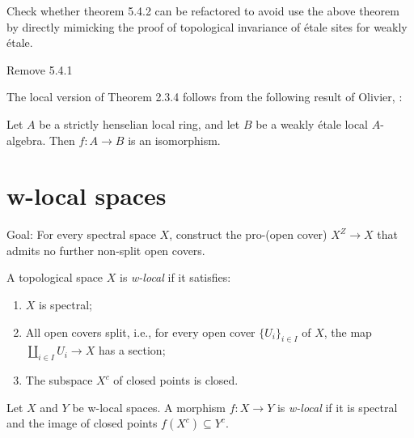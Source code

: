 \begin{lemma}
Check whether theorem 5.4.2 can be refactored to avoid use the above theorem by directly mimicking the proof of topological invariance of étale sites for weakly étale.

Remove 5.4.1



The local version of Theorem 2.3.4 follows from the following result of Olivier, \cite{Oli72}:

\begin{theorem}
Let $A$ be a strictly henselian local ring, and let $B$ be a weakly étale local $A$-algebra. Then $f: A \to B$ is an isomorphism.
    \label{thm:weakly-etale-local}
\end{theorem}


\section{w-local spaces}

Goal: For every spectral space \(X\), construct the pro-(open cover) \(X^Z \to X\) that admits no further non-split open covers.

\begin{definition}
    \label{def:w-local-space}
    A topological space \(X\) is \emph{w-local} if it satisfies:
    \begin{enumerate}
        \item \(X\) is spectral;
        \item All open covers split, i.e., for every open cover \(\{U_i\}_{i \in I}\) of \(X\), the map \(\coprod_{i \in I} U_i \to X\) has a section;
        \item The subspace \(X^c\) of closed points is closed.
    \end{enumerate}
\end{definition}

\begin{definition}
    Let \(X\) and \(Y\) be w-local spaces. A morphism \(f: X \to Y\) is \emph{w-local} if it is spectral and the image of closed points \(f(X^c) \subseteq Y^c\).
    \label{def:w-local-morphism}
\end{definition}

\begin{definition}
    \label{def:w-local-space-category}


\end{definition}
\end{lemma}
